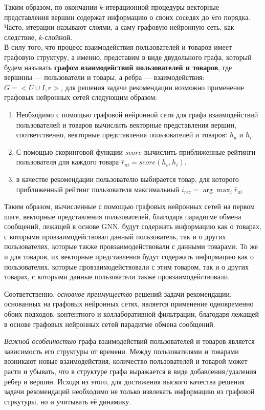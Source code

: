 \documentclass{mipt-thesis-ms}
\begin{document}
Таким образом, по окончании $k$-итерационной процедуры векторные представления вершин содержат информацию о своих соседях до $k$го порядка. Часто, итерации называют слоями, а саму графовую нейронную сеть, как следствие, $k$-слойной.
\\

В силу того, что процесс взаимодействия пользователей и товаров имеет графовую структуру, а именно, представим в виде двудольного графа, который будем называть {\bf графом взаимодействий пользователей и товаров}, где вершины --- пользователи и товары, а ребра --- взаимодействия: $G = <U \cup I, r>$, для решения задачи рекомендации возможно применение графовых нейронных сетей следующим образом:
\begin{enumerate}
\item Необходимо с помощью графовой нейронной сети для графа взаимодействий пользователей и товаров вычислить векторные представления вершин, соответственно, векторные представления пользователей и товаров: $h_u$ и $h_i$.
\item С помощью скоринговой функции $score$ вычислить приближенные рейтинги пользователя для каждого товара $\hat r_{ui} = score(h_v, h_i)$.
\item в качестве рекомендации пользователю выбирается товар, для которого приближенный рейтинг пользователя максимальный $i_{rec} = \arg \max_i \hat r_{ui}$
\end{enumerate}

Таким образом, вычисленные с помощью графовых нейронных сетей на первом шаге, векторные представления пользователей, благодаря парадигме обмена сообщений, лежащей в основе GNN, будут содержать информацию как о товарах, с которыми провзаимодействовал данный пользователь, так и о других пользователях, которые также провзаимодействовали с данными товарами. То же и для товаров, их векторные представления будут содержать информацию как о пользователях, которые провзаимодействовали с этим товаром, так и о других товарах, с которыми данные пользователи также провзаимодейcтвовали.

Соответственно, {\it основное преимущество} решений задачи рекомендации, основанных на графовых нейронных сетях, является применение одновременно обоих подходов, контентного и коллаборативной фильтрации, благодаря лежащей в основе графовых нейронных сетей парадигме обмена сообщений.

{\it Важной особенностью} графа взаимодействий пользователей и товаров является зависимость его структуры от времени. Между пользователями и товарами возникают новые взаимодействия, количество пользователей и товарой может расти и убывать, что в структуре графа выражается в виде добавления/удаления ребер и вершин. Исходя из этого, для достижения выского качества решения задачи рекомендаций необходимо не только извлекать информацию из графовой стркутуры, но и учитывать её динамику.
\end{document}
